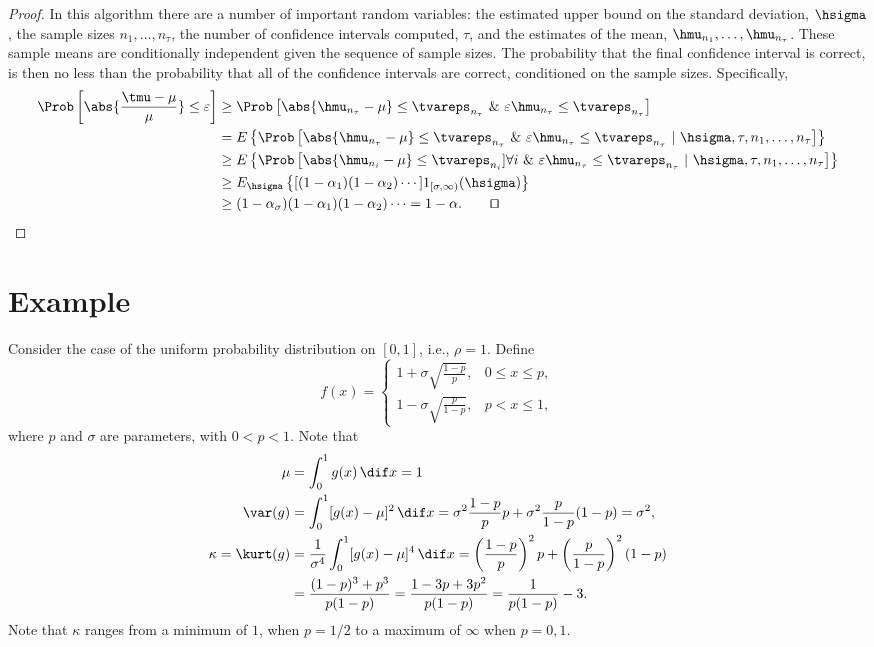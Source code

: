 \documentclass[graybox]{svmult}
\begin{document}
\begin{proof} In this algorithm there are a number of important random variables:  the estimated upper bound on the standard deviation, $\hsigma$, the sample sizes $n_1, \ldots, n_\tau$, the number of confidence intervals computed, $\tau$, and the estimates of the mean, $\hmu_{n_1}, \ldots, \hmu_{n_{\tau}}$. These sample means are conditionally independent given the sequence of sample sizes.  The probability that the final confidence interval is correct, is then no less than the probability that all of the confidence intervals are correct, conditioned on the sample sizes.  Specifically,
\begin{align*}
\Prob\left[\abs{\frac{\tmu-\mu}{\mu}} \le \varepsilon \right] & 
\ge \Prob\left[\abs{\hmu_{n_{\tau}}-\mu} \le \tvareps_{n_{\tau}} \ \& \ \varepsilon \hmu_{n_{\tau}} \le \tvareps_{n_{\tau}} \right] \\
& = E \left\{\Prob\left[\abs{\hmu_{n_{\tau}}-\mu} \le \tvareps_{n_{\tau}} \ \& \ \varepsilon \hmu_{n_{\tau}} \le \tvareps_{n_{\tau}} \ | \ \hsigma, \tau, n_1, \ldots, n_{\tau} \right] \right\} \\
& \ge E \left\{\Prob\left[\abs{\hmu_{n_{i}}-\mu} \le \tvareps_{n_{i}}] \forall i \ \& \ \varepsilon \hmu_{n_{\tau}} \le \tvareps_{n_{\tau}} \ | \ \hsigma, \tau, n_1, \ldots, n_{\tau} \right] \right\} \\
& \ge E_{\hsigma} \left\{[(1-\alpha_1)(1-\alpha_2) \cdots] 1_{[\sigma,\infty)}(\hsigma) \right\}\\
& \ge (1-\alpha_{\sigma}) (1-\alpha_1)(1-\alpha_2) \cdots = 1-\alpha. \qquad \qed
\end{align*}
\end{proof}


\section{Example}

Consider the case of the uniform probability distribution on $[0,1]$, i.e., $\rho=1$.  Define
\begin{equation} \label{exampleeq}
f(x) = \begin{cases} 1 + \sigma \sqrt{\frac{1-p}{p}}, & 0 \le x \le p,\\
1 - \sigma \sqrt{\frac{p}{1-p}}, & p < x \le 1,
\end{cases}
\end{equation}
where $p$ and $\sigma$ are parameters, with $0 < p < 1$.
Note that
\begin{align*}
\mu &= \int_0^1 g(x) \, \dif x = 1\\
\var(g) &= \int_0^1 [g(x)-\mu]^2 \, \dif x = \sigma^2 \frac{1-p}{p} p + \sigma^2 \frac{p}{1-p} (1-p) = \sigma^2, \\
\kappa = \kurt(g) &= \frac{1}{\sigma^4}\int_0^1 [g(x)-\mu]^4 \, \dif x = \left(\frac{1-p}{p}\right)^2 p + \left(\frac{p}{1-p} \right)^2 (1-p) \\
& = \frac{(1-p)^3 + p^3}{p(1-p)} = \frac{1-3p+3p^2}{p(1-p)} = \frac{1}{p(1-p)} - 3.
\end{align*}
Note that $\kappa$ ranges from a minimum of $1$, when $p=1/2$ to a maximum of $\infty$ when $p=0,1$.
\end{document}
